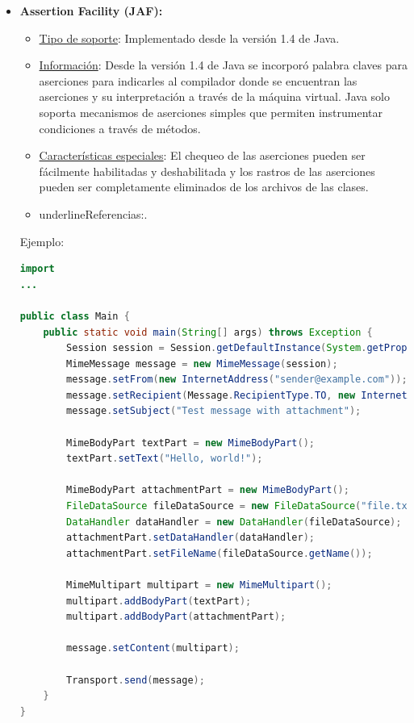 \begin{itemize}
\item \textbf{Assertion Facility (JAF):}

\begin{itemize}
\item \underline{Tipo de soporte}: Implementado desde la versión 1.4 de Java. \item \underline{Información}: Desde la versión 1.4 de Java se incorporó palabra claves para aserciones para indicarles al compilador donde se encuentran las aserciones y su interpretación a través de la máquina virtual. Java solo soporta mecanismos de aserciones simples que permiten instrumentar condiciones a través de métodos. \item \underline{Características especiales}: El chequeo de las aserciones pueden ser fácilmente habilitadas y deshabilitada y los rastros de las aserciones pueden ser completamente eliminados de los archivos de las clases. \item underline{Referencias}:\cite{Sun02,Rogers01a,Rogers01b}.
\end{itemize}

Ejemplo: 

\begin{lstlisting}[language=Java]
import 
...

public class Main {
    public static void main(String[] args) throws Exception {
        Session session = Session.getDefaultInstance(System.getProperties());
        MimeMessage message = new MimeMessage(session);
        message.setFrom(new InternetAddress("sender@example.com"));
        message.setRecipient(Message.RecipientType.TO, new InternetAddress("recipient@example.com"));
        message.setSubject("Test message with attachment");

        MimeBodyPart textPart = new MimeBodyPart();
        textPart.setText("Hello, world!");

        MimeBodyPart attachmentPart = new MimeBodyPart();
        FileDataSource fileDataSource = new FileDataSource("file.txt");
        DataHandler dataHandler = new DataHandler(fileDataSource);
        attachmentPart.setDataHandler(dataHandler);
        attachmentPart.setFileName(fileDataSource.getName());

        MimeMultipart multipart = new MimeMultipart();
        multipart.addBodyPart(textPart);
        multipart.addBodyPart(attachmentPart);

        message.setContent(multipart);

        Transport.send(message);
    }
}
\end{lstlisting}




\end{itemize}
